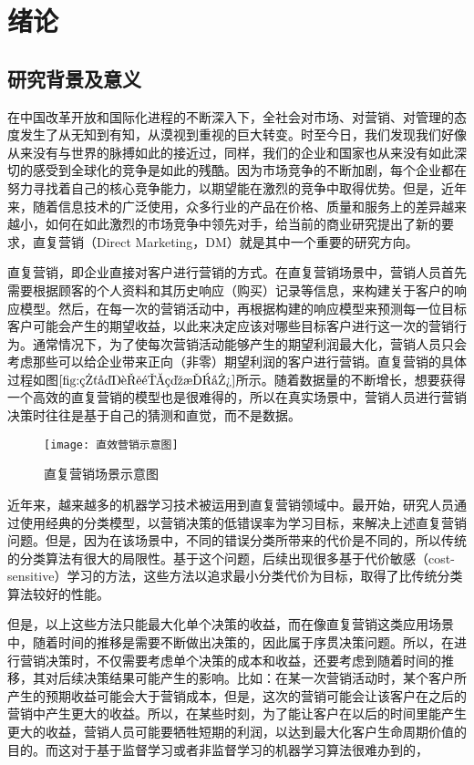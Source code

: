 \chapter{绪论}
 

 \section{研究背景及意义}
 在中国改革开放和国际化进程的不断深入下，全社会对市场、对营销、对管理的态度发生了从无知到有知，从漠视到重视的巨大转变。时至今日，我们发现我们好像从来没有与世界的脉搏如此的接近过，同样，我们的企业和国家也从来没有如此深切的感受到全球化的竞争是如此的残酷。因为市场竞争的不断加剧，每个企业都在努力寻找着自己的核心竞争能力，以期望能在激烈的竞争中取得优势。但是，近年来，随着信息技术的广泛使用，众多行业的产品在价格、质量和服务上的差异越来越小，如何在如此激烈的市场竞争中领先对手，给当前的商业研究提出了新的要求，直复营销（Direct Marketing，DM）就是其中一个重要的研究方向。

 直复营销，即企业直接对客户进行营销的方式。在直复营销场景中，营销人员首先需要根据顾客的个人资料和其历史响应（购买）记录等信息，来构建关于客户的响应模型。然后，在每一次的营销活动中，再根据构建的响应模型来预测每一位目标客户可能会产生的期望收益，以此来决定应该对哪些目标客户进行这一次的营销行为。通常情况下，为了使每次营销活动能够产生的期望利润最大化，营销人员只会考虑那些可以给企业带来正向（非零）期望利润的客户进行营销\citep{王广宇2013客户关系管理}。直复营销的具体过程如图$\ref{fig:直复营销示意图}$所示。随着数据量的不断增长，想要获得一个高效的直复营销的模型也是很难得的，所以在真实场景中，营销人员进行营销决策时往往是基于自己的猜测和直觉，而不是数据\citep{tkachenko2015autonomous}。
	\begin{figure}[htbp]
	\centering
	\texttt{[image: 直效营销示意图]}
	\caption{直复营销场景示意图}
	\label{fig:直复营销示意图}
	\end{figure}

近年来，越来越多的机器学习技术被运用到直复营销领域中。最开始，研究人员通过使用经典的分类模型，以营销决策的低错误率为学习目标，来解决上述直复营销问题。但是，因为在该场景中，不同的错误分类所带来的代价是不同的，所以传统的分类算法有很大的局限性。基于这个问题，后续出现很多基于代价敏感（cost-sensitive）学习的方法，这些方法以追求最小分类代价为目标，取得了比传统分类算法较好的性能。

但是，以上这些方法只能最大化单个决策的收益，而在像直复营销这类应用场景中，随着时间的推移是需要不断做出决策的，因此属于序贯决策问题。所以，在进行营销决策时，不仅需要考虑单个决策的成本和收益，还要考虑到随着时间的推移，其对后续决策结果可能产生的影响。比如：在某一次营销活动时，某个客户所产生的预期收益可能会大于营销成本，但是，这次的营销可能会让该客户在之后的营销中产生更大的收益。所以，在某些时刻，为了能让客户在以后的时间里能产生更大的收益，营销人员可能要牺牲短期的利润，以达到最大化客户生命周期价值的目的。而这对于基于监督学习或者非监督学习的机器学习算法很难办到的，

